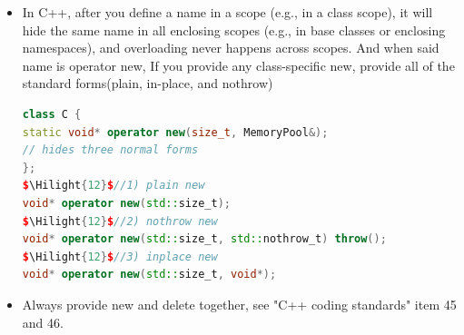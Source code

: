 \documentclass[a4paper,12pt,twoside]{book}
\newcommand{\Hilight}[1]{\makebox[0pt][l]{\color{yellow}\rule[-3pt]{#1em}{11pt}}}
\begin{document}
\begin{itemize}
\item In C++, after you define a name in a scope (e.g., in a class scope), it will hide the same name in all enclosing scopes (e.g., in base classes or enclosing namespaces), and overloading never happens across scopes. And when said name is operator new, If you provide any class-specific new, provide all of the standard forms(plain, in-place, and nothrow)
\begin{lstlisting}[frame=single, language=c++, mathescape=true]
class C {
static void* operator new(size_t, MemoryPool&);
// hides three normal forms
};
$\Hilight{12}$//1) plain new
void* operator new(std::size_t);
$\Hilight{12}$//2) nothrow new
void* operator new(std::size_t, std::nothrow_t) throw();
$\Hilight{12}$//3) inplace new
void* operator new(std::size_t, void*);
\end{lstlisting}

\item Always provide new and delete together, see "C++ coding standards" item 45 and 46.
\end{itemize}
\end{document}
